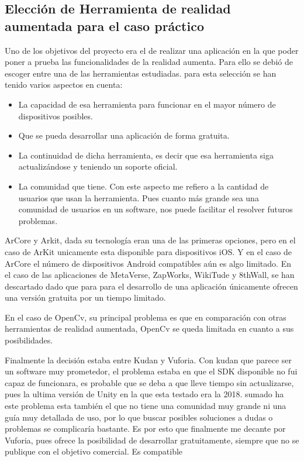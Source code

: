 \subsection{Elección de Herramienta de realidad aumentada para el caso práctico}

Uno de los objetivos del proyecto era el de realizar una aplicación en la que poder poner a prueba las funcionalidades de la realidad aumenta. Para ello se debió de escoger entre una de las herramientas estudiadas. para esta selección se han tenido varios aspectos en cuenta: 
\begin{itemize}
	\item La capacidad de esa herramienta para funcionar en el mayor número de dispositivos posibles.
	\item Que se pueda desarrollar una aplicación de forma gratuita.
	\item La continuidad de dicha herramienta, es decir que esa herramienta siga actualizándose y teniendo un soporte oficial.
	\item La comunidad que tiene. Con este aspecto me refiero a la cantidad de usuarios que usan la herramienta. Pues cuanto más grande sea una comunidad de usuarios en un software, nos puede facilitar el resolver futuros problemas.
	
\end{itemize}

ArCore y Arkit, dada su tecnología eran una de las primeras opciones, pero en el caso de ArKit unicamente esta disponible para dispositivos iOS. Y en el caso de ArCore el número de dispositivos Android compatibles aún es algo limitado.
En el caso de las aplicaciones de MetaVerse, ZapWorks, WikiTude y 8thWall, se han descartado dado que para para el desarrollo de una aplicación únicamente ofrecen una versión gratuita por un tiempo limitado.

En el caso de OpenCv, su principal problema es que en comparación con otras herramientas de realidad aumentada, OpenCv se queda limitada en cuanto a sus posibilidades.

Finalmente la decisión estaba entre Kudan y Vuforia. Con kudan que parece ser un software muy prometedor, el problema estaba en que el SDK disponible no fui capaz de funcionara, es probable que se deba a que lleve tiempo sin actualizarse, pues la ultima versión de Unity en la que esta testado era la 2018. sumado ha este problema esta también el que no tiene una comunidad muy grande ni una guía muy detallada de uso, por lo que buscar posibles soluciones a dudas o problemas se complicaría bastante.
Es por esto que finalmente me decante por Vuforia, pues  ofrece la posibilidad de desarrollar gratuitamente, siempre que no se publique con el objetivo comercial. Es compatible 


